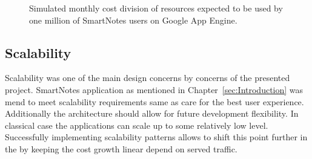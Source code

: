 \begin{figure}[ht]
  \begin{center}
  \end{center}
  \caption{Simulated monthly cost division of resources expected to be used by one million of SmartNotes users on Google App Engine.}
  \label{fig:gae_cost}
\end{figure}

\subsection{Scalability}\label{subsec:scalability_on_gae}
Scalability was one of the main design concerns by concerns of the presented project. SmartNotes application as mentioned in Chapter~\ref{sec:Introduction} was mend to meet scalability requirements same as care for the best user experience. Additionally the architecture should allow for future development flexibility. In classical case the applications can scale up to some relatively low level. Successfully implementing scalability patterns allows to shift this point further in the by keeping the cost growth linear depend on served traffic.  

